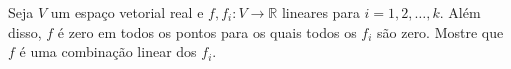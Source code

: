 Seja \(V\) um espaço vetorial real e \(f, f_{i}\colon  V \to \mathbb{R}\) lineares para \(i = 1, 2, \dots , k.\) Além disso, \(f\) é zero em todos os pontos para os quais todos os \(f_{i}\) são zero. Mostre que \(f\) é uma combinação linear dos \(f_{i}\).
